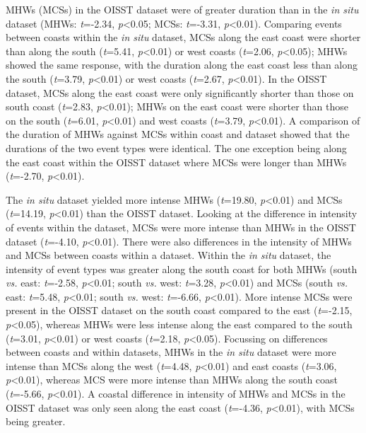 \documentclass[a4paper,10pt,review]{elsarticle}
\begin{document}
MHWs (MCSs) in the OISST dataset were of greater duration than in the \emph{in situ} dataset (MHWs: \emph{t}=-2.34, \emph{p}<0.05; MCSs: \emph{t}=-3.31, \emph{p}<0.01). Comparing events between coasts within the \emph{in situ} dataset, MCSs along the east coast were shorter than along the south (\emph{t}=5.41, \emph{p}<0.01) or west coasts (\emph{t}=2.06, \emph{p}<0.05); MHWs showed the same response, with the duration along the east coast less than along the south (\emph{t}=3.79, \emph{p}<0.01) or west coasts (\emph{t}=2.67, \emph{p}<0.01). In the OISST dataset, MCSs along the east coast were only significantly shorter than those on south coast (\emph{t}=2.83, \emph{p}<0.01); MHWs on the east coast were shorter than those on the south (\emph{t}=6.01, \emph{p}<0.01) and west coasts (\emph{t}=3.79, \emph{p}<0.01). A comparison of the duration of MHWs against MCSs within coast and dataset showed that the durations of the two event types were identical. The one exception being along the east coast within the OISST dataset where MCSs were longer than MHWs (\emph{t}=-2.70, \emph{p}<0.01).

The \emph{in situ} dataset yielded more intense MHWs (\emph{t}=19.80, \emph{p}<0.01) and MCSs (\emph{t}=14.19, \emph{p}<0.01) than the OISST dataset. Looking at the difference in intensity of events within the dataset, MCSs were more intense than MHWs in the OISST dataset (\emph{t}=-4.10, \emph{p}<0.01). There were also differences in the intensity of MHWs and MCSs between coasts within a dataset. Within the \emph{in situ} dataset, the intensity of event types was greater along the south coast for both MHWs (south \emph{vs.} east: \emph{t}=-2.58, \emph{p}<0.01; south \emph{vs.} west: \emph{t}=3.28, \emph{p}<0.01) and MCSs (south \emph{vs.} east: \emph{t}=5.48, \emph{p}<0.01; south \emph{vs.} west: \emph{t}=-6.66, \emph{p}<0.01). More intense MCSs were present in the OISST dataset on the south coast compared to the east (\emph{t}=-2.15, \emph{p}<0.05), whereas MHWs were less intense along the east compared to the south (\emph{t}=3.01, \emph{p}<0.01) or west coasts (\emph{t}=2.18, \emph{p}<0.05). Focussing on differences between coasts and within datasets, MHWs in the \emph{in situ} dataset were more intense than MCSs along the west (\emph{t}=4.48, \emph{p}<0.01) and east coasts (\emph{t}=3.06, \emph{p}<0.01), whereas MCS were more intense than MHWs along the south coast (\emph{t}=-5.66, \emph{p}<0.01). A coastal difference in intensity of MHWs and MCSs in the OISST dataset was only seen along the east coast (\emph{t}=-4.36, \emph{p}<0.01), with MCSs being greater.
\end{document}
